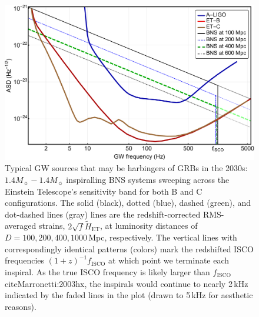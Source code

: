 \documentclass{aa}
\begin{document}
\begin{figure}[h]
\includegraphics[width=\linewidth]{../Figs/ET_strains_redshifted.pdf}
\caption{Typical GW sources that may be harbingers of GRBs in the 2030s: $1.4 M_\sun-1.4 M_\sun$ inspiralling BNS systems sweeping across 
the Einstein Telescope's sensitivity band for both B and C configurations.
The solid (black), dotted (blue), dashed (green), and dot-dashed lines (gray) lines are the redshift-corrected
RMS-averaged strains, $2\sqrt{f}\tilde{H}_\text{ET}$, at luminosity distances of $D=100, 200, 400, 1000\,$Mpc, respectively. 
The vertical lines with correspondingly identical patterns (colors) mark the redshifted ISCO frequencies $(1+z)^{-1} f_\text{ISCO}$ at which point we terminate each inspiral.
As the true ISCO frequency is likely larger than $f_\text{ISCO}$ cite{Marronetti:2003hx}, the inspirals would continue to nearly 2\,kHz indicated by the 
faded lines in the plot (drawn to 5\,kHz for aesthetic reasons).
}
\label{fig:ETB2030}
\end{figure}
\end{document}
